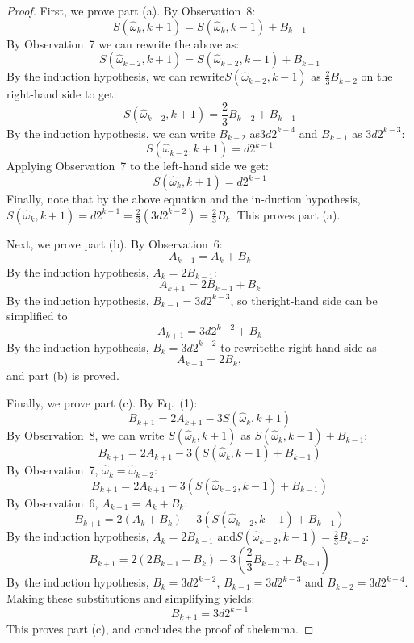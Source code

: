 \documentclass[12pt,floatfix,reprint,nofootinbib,amsmath,amssymb,epsfig,pre,floats,letterpaper,groupedaffiliation]{revtex4-1}
\theoremstyle{definition}
\theoremstyle{definition}
\begin{document}
\begin{proof}
First, we prove part (a). By Observation~8:
\[
S(\hat{\omega}_k, k+1) = S(\hat{\omega}_k, k-1) + B_{k-1}
\]
By Observation~7 we can rewrite the above as:
\[
S(\hat{\omega}_{k-2}, k+1) = S(\hat{\omega}_{k-2}, k-1) + B_{k-1}
\]
By the induction hypothesis, we can rewrite\linebreak $S(\hat{\omega}_{k-2}, k-1)$ as $\frac{2}{3} B_{k-2}$ on the right-hand side to get:\linebreak
\[
S(\hat{\omega}_{k-2}, k+1) = \frac{2}{3} B_{k-2} + B_{k-1}
\]
By the induction hypothesis, we can write $B_{k-2}$ as\linebreak $3d 2^{k-4}$ and $B_{k-1}$ as $3d 2^{k-3}$:
\[
S(\hat{\omega}_{k-2}, k+1) = d 2^{k-1}
\]
Applying Observation~7 to the left-hand side we get:
\[
S(\hat{\omega}_k, k+1) = d 2^{k-1}
\]
Finally, note that by the above equation and the in-\linebreak duction hypothesis, $S(\hat{\omega}_k, k+1) = d 2^{k-1} = \frac{2}{3}(3d 2^{k-2}) = \frac{2}{3} B_k$. This proves part (a).

Next, we prove part (b). By Observation~6:
\[
A_{k+1} = A_k + B_k
\]
By the induction hypothesis, $A_k = 2 B_{k-1}$:
\[
A_{k+1} = 2 B_{k-1} + B_k
\]
By the induction hypothesis, $B_{k-1} = 3d 2^{k-3}$, so the\linebreak right-hand side can be simplified to
\[
A_{k+1} = 3d 2^{k-2} + B_k
\]
By the induction hypothesis, $B_k = 3d 2^{k-2}$ to rewrite\linebreak the right-hand side as
\[
A_{k+1} = 2 B_k,
\]
and part (b) is proved.

Finally, we prove part (c). By Eq.~(1):
\[
B_{k+1} = 2 A_{k+1} - 3 S(\hat{\omega}_k, k+1)
\]
By Observation~8, we can write $S(\hat{\omega}_k, k+1)$ as $S(\hat{\omega}_k, k-1) + B_{k-1}$:
\[
B_{k+1} = 2 A_{k+1} - 3 (S(\hat{\omega}_k, k-1) + B_{k-1})
\]
By Observation~7, $\hat{\omega}_k = \hat{\omega}_{k-2}$:
\[
B_{k+1} = 2 A_{k+1} - 3 (S(\hat{\omega}_{k-2}, k-1) + B_{k-1})
\]
By Observation~6, $A_{k+1} = A_k + B_k$:
\[
B_{k+1} = 2 (A_k + B_k) - 3 (S(\hat{\omega}_{k-2}, k-1) + B_{k-1})
\]
By the induction hypothesis, $A_k = 2 B_{k-1}$ and\linebreak $S(\hat{\omega}_{k-2}, k-1) = \frac{2}{3} B_{k-2}$:
\[
B_{k+1} = 2 (2 B_{k-1} + B_k) - 3 \left( \frac{2}{3} B_{k-2} + B_{k-1} \right)
\]
By the induction hypothesis, $B_k = 3d 2^{k-2}$, $B_{k-1} = 3d 2^{k-3}$ and $B_{k-2} = 3d 2^{k-4}$. Making these substitutions and simplifying yields:
\[
B_{k+1} = 3d 2^{k-1}
\]
This proves part (c), and concludes the proof of the\linebreak lemma.
\end{proof}
\end{document}
